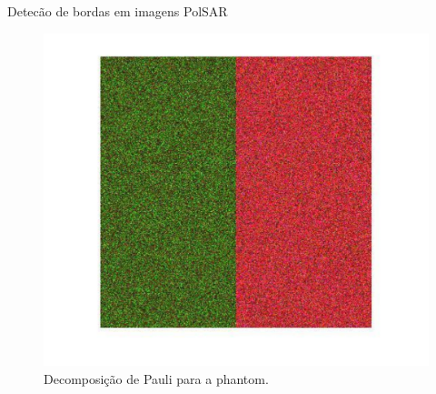 \documentclass[10pt]{beamer}
\begin{document}
\begin{frame}{Detecão de bordas em imagens PolSAR}
  \begin{figure}[hbt]
\centering
	\includegraphics[scale=0.4]{phanton_nhfc_dec_pauli.pdf}
	\caption{Decomposição de Pauli para a phantom.}\label{cap_acf_fig01}
\end{figure}
\end{frame}
\end{document}
